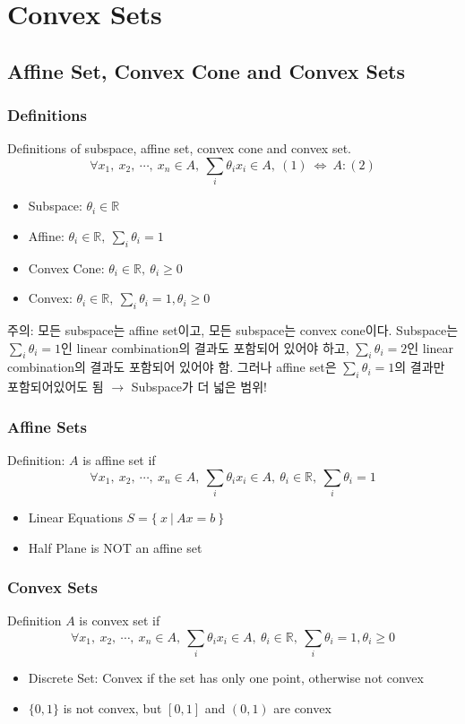 \section{Convex Sets}

\subsection{Affine Set, Convex Cone and Convex Sets}

\subsubsection*{Definitions}
Definitions of subspace, affine set, convex cone and convex set.
$$
    \forall x_1,~x_2,~\cdots,~x_n \in A,~\sum_i \theta_i x_i \in A,~(1)~\Leftrightarrow~A: (2)
$$
\begin{itemize}
    \item Subspace: $\theta_i \in \mathbb{R}$
    \item Affine: $\theta_i \in \mathbb{R},~ \sum_i \theta_i = 1$
    \item Convex Cone: $\theta_i \in \mathbb{R},~ \theta_i \geq 0$
    \item Convex: $\theta_i \in \mathbb{R},~ \sum_i \theta_i = 1, \theta_i \geq 0$
\end{itemize}

주의: 모든 subspace는 affine set이고, 모든 subspace는 convex cone이다. Subspace는 $\sum_i \theta_i = 1$인
linear combination의 결과도 포함되어 있어야 하고, $\sum_i \theta_i = 2$인 linear combination의 결과도 포함되어 있어야 함.
그러나 affine set은 $\sum_i \theta_i = 1$의 결과만 포함되어있어도 됨 $\rightarrow$ Subspace가 더 넓은 범위!

\subsubsection*{Affine Sets}
Definition: $A$ is affine set if
$$
\forall x_1,~x_2,~\cdots,~x_n \in A,~\sum_i \theta_i x_i \in A,~\theta_i \in \mathbb{R},~ \sum_i \theta_i = 1
$$
\begin{itemize}
    \item Linear Equations $S = \{~x~|~Ax=b~\}$
    \item Half Plane is NOT an affine set
\end{itemize}

\subsubsection*{Convex Sets}
Definition $A$ is convex set if
$$
\forall x_1,~x_2,~\cdots,~x_n \in A,~\sum_i \theta_i x_i \in A,~\theta_i \in \mathbb{R},~ \sum_i \theta_i = 1, \theta_i \geq 0
$$
\begin{itemize}
    \item Discrete Set: Convex if the set has only one point, otherwise not convex
    \item $\{0,1\}$ is not convex, but $[0,1]$ and $(0,1)$ are convex
\end{itemize}

